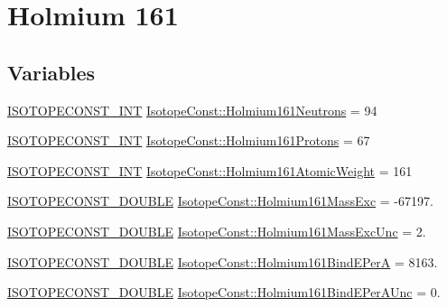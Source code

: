 \hypertarget{group___isotope_const-_holmium-_ho161}{}\section{Holmium 161}
\label{group___isotope_const-_holmium-_ho161}
\subsection*{Variables}
\begin{DoxyCompactItemize}
\item 
\mbox{\hyperlink{group___isotope_const-_macros_ga5f18360b3e99483a35c32d789e62621c}{I\+S\+O\+T\+O\+P\+E\+C\+O\+N\+S\+T\+\_\+\+I\+NT}} \mbox{\hyperlink{group___isotope_const-_holmium-_ho161_ga424176ec71c468ee0f76e88bc2b08a80}{Isotope\+Const\+::\+Holmium161\+Neutrons}} = 94
\item 
\mbox{\hyperlink{group___isotope_const-_macros_ga5f18360b3e99483a35c32d789e62621c}{I\+S\+O\+T\+O\+P\+E\+C\+O\+N\+S\+T\+\_\+\+I\+NT}} \mbox{\hyperlink{group___isotope_const-_holmium-_ho161_ga947aaffc24646f82c4cae1b30023064f}{Isotope\+Const\+::\+Holmium161\+Protons}} = 67
\item 
\mbox{\hyperlink{group___isotope_const-_macros_ga5f18360b3e99483a35c32d789e62621c}{I\+S\+O\+T\+O\+P\+E\+C\+O\+N\+S\+T\+\_\+\+I\+NT}} \mbox{\hyperlink{group___isotope_const-_holmium-_ho161_ga7f61487ece37067fc2e34b3e768b1d4e}{Isotope\+Const\+::\+Holmium161\+Atomic\+Weight}} = 161
\item 
\mbox{\hyperlink{group___isotope_const-_macros_ga8f45a7272ce02c0b4c65c44636ed719a}{I\+S\+O\+T\+O\+P\+E\+C\+O\+N\+S\+T\+\_\+\+D\+O\+U\+B\+LE}} \mbox{\hyperlink{group___isotope_const-_holmium-_ho161_gad1fdb67eb07b258c4175a3cbfb7e2a05}{Isotope\+Const\+::\+Holmium161\+Mass\+Exc}} = -\/67197.
\item 
\mbox{\hyperlink{group___isotope_const-_macros_ga8f45a7272ce02c0b4c65c44636ed719a}{I\+S\+O\+T\+O\+P\+E\+C\+O\+N\+S\+T\+\_\+\+D\+O\+U\+B\+LE}} \mbox{\hyperlink{group___isotope_const-_holmium-_ho161_ga40bffb7905abea3809c97e0d0ecc8383}{Isotope\+Const\+::\+Holmium161\+Mass\+Exc\+Unc}} = 2.
\item 
\mbox{\hyperlink{group___isotope_const-_macros_ga8f45a7272ce02c0b4c65c44636ed719a}{I\+S\+O\+T\+O\+P\+E\+C\+O\+N\+S\+T\+\_\+\+D\+O\+U\+B\+LE}} \mbox{\hyperlink{group___isotope_const-_holmium-_ho161_ga5f3db0c27202ae32cfc5f7d068569dcd}{Isotope\+Const\+::\+Holmium161\+Bind\+E\+PerA}} = 8163.
\item 
\mbox{\hyperlink{group___isotope_const-_macros_ga8f45a7272ce02c0b4c65c44636ed719a}{I\+S\+O\+T\+O\+P\+E\+C\+O\+N\+S\+T\+\_\+\+D\+O\+U\+B\+LE}} \mbox{\hyperlink{group___isotope_const-_holmium-_ho161_gae8f9ec42c66d3a21812a77b0a702b6ad}{Isotope\+Const\+::\+Holmium161\+Bind\+E\+Per\+A\+Unc}} = 0.

\end{DoxyCompactItemize}
